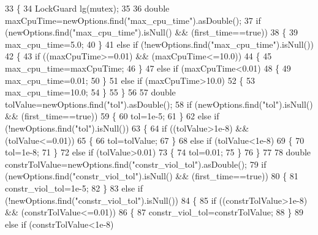 \begin{DoxyCode}
33 \{
34     LockGuard lg(mutex);
35 
36     \textcolor{keywordtype}{double} maxCpuTime=newOptions.find(\textcolor{stringliteral}{"max\_cpu\_time"}).asDouble();
37     \textcolor{keywordflow}{if} (newOptions.find(\textcolor{stringliteral}{"max\_cpu\_time"}).isNull() && (first\_time==\textcolor{keyword}{true}))
38     \{
39         max\_cpu\_time=5.0;
40     \}
41     \textcolor{keywordflow}{else} \textcolor{keywordflow}{if} (!newOptions.find(\textcolor{stringliteral}{"max\_cpu\_time"}).isNull())
42     \{
43         \textcolor{keywordflow}{if} ((maxCpuTime>=0.01) && (maxCpuTime<=10.0))
44         \{
45             max\_cpu\_time=maxCpuTime;
46         \}
47         \textcolor{keywordflow}{else} \textcolor{keywordflow}{if} (maxCpuTime<0.01)
48         \{
49             max\_cpu\_time=0.01;
50         \}
51         \textcolor{keywordflow}{else} \textcolor{keywordflow}{if} (maxCpuTime>10.0)
52         \{
53             max\_cpu\_time=10.0;
54         \}
55     \}
56 
57     \textcolor{keywordtype}{double} tolValue=newOptions.find(\textcolor{stringliteral}{"tol"}).asDouble();
58     \textcolor{keywordflow}{if} (newOptions.find(\textcolor{stringliteral}{"tol"}).isNull() && (first\_time==\textcolor{keyword}{true}))
59     \{
60         tol=1e-5;
61     \}
62     \textcolor{keywordflow}{else} \textcolor{keywordflow}{if} (!newOptions.find(\textcolor{stringliteral}{"tol"}).isNull())
63     \{
64         \textcolor{keywordflow}{if} ((tolValue>1e-8) && (tolValue<=0.01))
65         \{
66             tol=tolValue;
67         \}
68         \textcolor{keywordflow}{else} \textcolor{keywordflow}{if} (tolValue<1e-8)
69         \{
70             tol=1e-8;
71         \}
72         \textcolor{keywordflow}{else} \textcolor{keywordflow}{if} (tolValue>0.01)
73         \{
74             tol=0.01;
75         \}
76     \}
77 
78     \textcolor{keywordtype}{double} constrTolValue=newOptions.find(\textcolor{stringliteral}{"constr\_viol\_tol"}).asDouble();
79     \textcolor{keywordflow}{if} (newOptions.find(\textcolor{stringliteral}{"constr\_viol\_tol"}).isNull() && (first\_time==\textcolor{keyword}{true}))
80     \{
81         constr\_viol\_tol=1e-5;
82     \}
83     \textcolor{keywordflow}{else} \textcolor{keywordflow}{if} (!newOptions.find(\textcolor{stringliteral}{"constr\_viol\_tol"}).isNull())
84     \{
85         \textcolor{keywordflow}{if} ((constrTolValue>1e-8) && (constrTolValue<=0.01))
86         \{
87             constr\_viol\_tol=constrTolValue;
88         \}
89         \textcolor{keywordflow}{else} \textcolor{keywordflow}{if} (constrTolValue<1e-8)

\end{DoxyCode}
